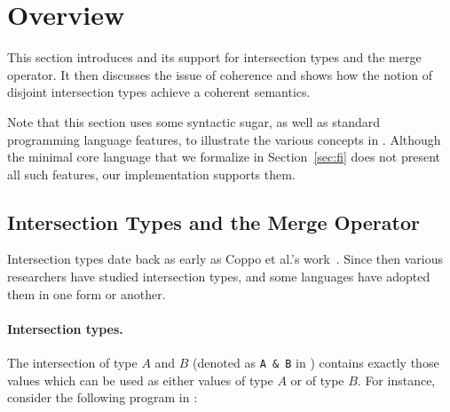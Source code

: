 \section{Overview} \label{sec:overview}

This section introduces \name and its support for intersection types and the
merge operator. It then discusses the issue of coherence and shows how the
notion of disjoint intersection types achieve a coherent semantics.

Note that this section uses some syntactic sugar, as well as standard
programming language features, to illustrate the various concepts in
\name. Although the minimal core language that we formalize in
Section~\ref{sec:fi} does not present all such features, our implementation
supports them.


\subsection{Intersection Types and the Merge Operator}

Intersection types date back as early as Coppo et
al.'s work~\cite{coppo1981functional}. Since then various researchers have
studied intersection types, and some languages have adopted them in one
form or another.

\paragraph{Intersection types.}
The intersection of type $A$ and $B$ (denoted as \lstinline{A & B} in
\name) contains exactly those values
which can be used as either values of type $A$ or of type $B$. For instance,
consider the following program in \name:

